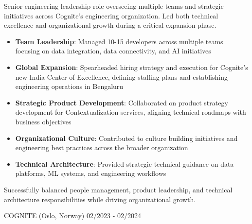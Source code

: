 \documentclass[singlesided,
               paper=a4,
               fontsize=10pt
              ]{my-resume}
\begin{document}
    {
        Senior engineering leadership role overseeing multiple teams and strategic initiatives across Cognite's engineering organization. Led both technical excellence and organizational growth during a critical expansion phase.

        \begin{itemize}[leftmargin=2em]
            \item \textbf{Team Leadership}: Managed 10-15 developers across multiple teams focusing on data integration, data connectivity, and AI initiatives
            \item \textbf{Global Expansion}: Spearheaded hiring strategy and execution for Cognite's new India Center of Excellence, defining staffing plans and establishing engineering operations in Bengaluru
            \item \textbf{Strategic Product Development}: Collaborated on product strategy development for Contextualization services, aligning technical roadmaps with business objectives
            \item \textbf{Organizational Culture}: Contributed to culture building initiatives and engineering best practices across the broader organization
            \item \textbf{Technical Architecture}: Provided strategic technical guidance on data platforms, ML systems, and engineering workflows
        \end{itemize}

        Successfully balanced people management, product leadership, and technical architecture responsibilities while driving organizational growth.
    }
%
	{COGNITE (Oslo, Norway)}
	{02/2023 - 02/2024}
\end{document}
